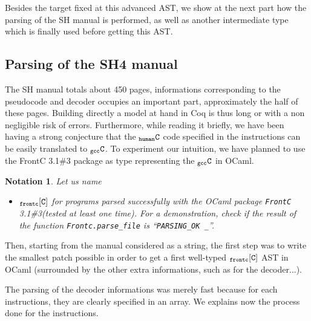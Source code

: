 \documentclass[a4paper, 11pt]{article}
\newcommand{\frontcv}{3.1\#3\xspace}
\newcommand{\gccC}{$_{\tt gcc}{\tt C}$\xspace}
\newcommand{\hC}{$_{\tt human}{\tt C}$\xspace}
\newcommand{\frontC}{$_{\tt frontc}{\tt [C]}$\xspace}
\newtheorem*{note}{Notation}
\begin{document}
Besides the target fixed at this advanced AST, we show at the next part how the parsing of the SH manual is performed, as well as another intermediate type which is finally used before getting this AST.


  \subsection{Parsing of the SH4 manual}
The SH manual totals about 450 pages, informations corresponding to the pseudocode and decoder occupies an important part, approximately the half of these pages. Building directly a model at hand in Coq is thus long or with a non negligible risk of errors. 
Furthermore, while reading it briefly, we have been having a strong conjecture that the \hC code specified in the instructions can be easily translated to \gccC. To experiment our intuition, we have planned to use the FrontC \frontcv package as type representing the \gccC in OCaml.
\begin{note}
Let us name
\begin{itemize}
\item \frontC for programs parsed successfully with the OCaml package {\tt FrontC} \frontcv (tested at least one time). For a demonstration, check if the result of the function \verb|Frontc.parse_file| is ``\verb|PARSING_OK _|''. 
\end{itemize}
\end{note}
Then, starting from the manual considered as a string, the first step was to write the smallest patch possible in order to get a first well-typed \frontC AST in OCaml (surrounded by the other extra informations, such as for the decoder...).

The parsing of the decoder informations was merely fast because for each instructions, they are clearly specified in an array. We explains now the process done for the instructions.
\end{document}
